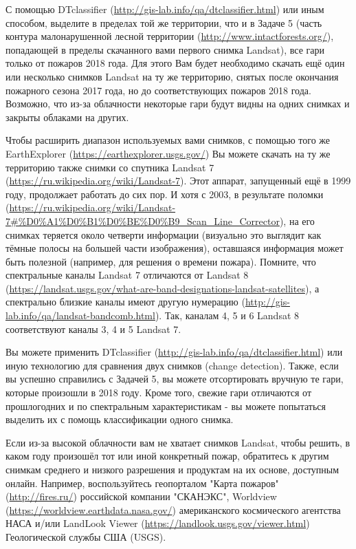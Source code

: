 
С помощью DTclassifier (\url{http://gis-lab.info/qa/dtclassifier.html}) или иным способом, выделите в 
пределах той же территории, 
что и в Задаче 5 (часть контура малонарушенной лесной территории (\url{http://www.intactforests.org/}), 
попадающей в пределы скачанного вами первого снимка Landsat), все гари только от пожаров 2018 года. Для этого Вам будет необходимо скачать ещё один или несколько снимков Landsat на ту же территорию, снятых после окончания пожарного сезона 2017 года, но до соответствующих пожаров 2018 года. Возможно, что из-за облачности некоторые гари будут видны на одних снимках и закрыты облаками на других.

Чтобы расширить диапазон используемых вами снимков, с помощью того же EarthExplorer (\url{https://earthexplorer.usgs.gov/}) 
Вы можете скачать на ту же территорию также снимки со спутника Landsat 7 (\url{https://ru.wikipedia.org/wiki/Landsat-7}). 
Этот аппарат, запущенный ещё в 1999 году, продолжает работать до сих пор. И хотя с 2003, в результате поломки (\url{https://ru.wikipedia.org/wiki/Landsat-7#%D0%A1%D0%B1%D0%BE%D0%B9_Scan_Line_Corrector}), 
на его снимках теряется около четверти информации (визуально это выглядит как тёмные полосы на большей 
части изображения), оставшаяся информация может быть полезной (например, для решения о времени пожара). 
Помните, что спектральные каналы Landsat 7 отличаются от Landsat 8 (\url{https://landsat.usgs.gov/what-are-band-designations-landsat-satellites}), 
а спектрально близкие каналы имеют другую нумерацию \linebreak (\url{http://gis-lab.info/qa/landsat-bandcomb.html}). Так, каналам 4, 5 и 6 Landsat 8 соответствуют каналы 3, 4 и 5 Landsat 7. 

Вы можете применить DTclassifier (\url{http://gis-lab.info/qa/dtclassifier.html}) или иную технологию для сравнения двух снимков (change detection). Также, если вы успешно справились с Задачей 5, вы можете отсортировать вручную те гари, которые произошли в 2018 году. Кроме того, свежие гари отличаются от прошлогодних и по спектральным характеристикам - вы можете попытаться выделить их с помощь классификации одного снимка.

Если из-за высокой облачности вам не хватает снимков Landsat, чтобы решить, в каком году произошёл 
тот или иной конкретный пожар, обратитесь к другим снимкам среднего и низкого разрешения и продуктам 
на их основе, доступным онлайн. Например, воспользуйтесь геопорталом "Карта пожаров" (\url{http://fires.ru/}) 
российской компании "СКАНЭКС", Worldview (\url{https://worldview.earthdata.nasa.gov/}) американского 
космического агентства НАСА и/или LandLook Viewer (\url{https://landlook.usgs.gov/viewer.html}) Геологической службы США (USGS). 

